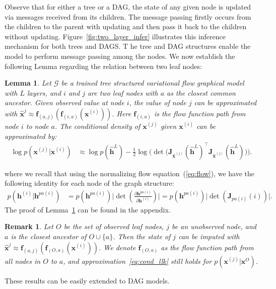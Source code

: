 \documentclass{article} %
\newtheorem{lemma}{Lemma}
\newtheorem{remark}{Remark}
\begin{document}
Observe that for either a tree or a DAG, the state of any given node is updated via messages received from its children. 
The message passing firstly occurs from the children to the parent with updating and then pass it back to the children without updating. 
Figure~\ref{fig:two_layer_infer} illustrates this inference mechanism for both trees and DAGS. T
he tree and DAG structures enable the model to perform message passing among the nodes.  
We now establish the following Lemma regarding the relation between two leaf nodes:
\begin{lemma}\label{lm:apprx}
Let $\mathcal{G}$ be a trained tree structured variational flow graphical model with $L$ layers, and $i$ and $j$ are two leaf nodes with $a$ as the closest common ancestor. Given observed value at node $i$, the value of node $j$ can be approximated with   $\widehat{\mathbf{x}}^{j} \approx  \mathbf{f}_{(a,j)}(\mathbf{f}_{(i, a)}(\mathbf{x}^{(i)}))$. Here $\mathbf{f}_{(i, a)}$ is the flow function path from node $i$ to node $a$. The conditional density of $\mathbf{x}^{(j)}$ given $\mathbf{x}^{(i)}$ can be approximated by: 
\begin{align} \label{eq:cond_llk}
\log p(\mathbf{x}^{(j)} | \mathbf{x}^{(i)}) &\approx  \log p(\widehat{\mathbf{h}}^L) -  \frac{1}{2} \log \big(\det \big(\mathbf{J}_{\widehat{\mathbf{x}}^{(j)}}(\widehat{\mathbf{h}}^L)^\top\mathbf{J}_{\widehat{\mathbf{x}}^{(j)}}(\widehat{\mathbf{h}}^L)\big) \big).
\end{align}
\end{lemma}
where we recall that using the normalizing flow equation~(\ref{eq:flow}), we have the following identity for each node of the graph structure:
\begin{align*}
p(\mathbf{h}^{(i)} | \mathbf{h}^{pa(i)}) & = p(\mathbf{h}^{pa(i)}) \big|\det(\frac{\partial \mathbf{h}^{pa(i)} }{\partial \mathbf{h}^{(i)}})\big| =
p(\mathbf{h}^{pa(i)}) \big|\det(\mathbf{J}_{pa(i)}(i))\big| .
\end{align*} 
The proof of Lemma~\ref{lm:apprx} can be found in the appendix. 

\begin{remark}\label{rmk:apprx_mul}
Let $O$ be the set of observed leaf nodes, $j$ be an unobserved node, and $a$ is the closest ancestor of $O \cup \{a\}$. Then the state of $j$ can be imputed with  $\widehat{\mathbf{x}}^{j} \approx  \mathbf{f}_{(a,j)}(\mathbf{f}_{(O, a)}(\mathbf{x}^{(i)}))$.  
We denote $\mathbf{f}_{(O, a)}$ as the flow function path from all nodes in $O$ to $a$, and approximation~\eqref{eq:cond_llk} still holds for $p(\mathbf{x}^{(j)} | \mathbf{x}^{O})$.
\end{remark}
These results can be easily extended to DAG models. 
\end{document}
